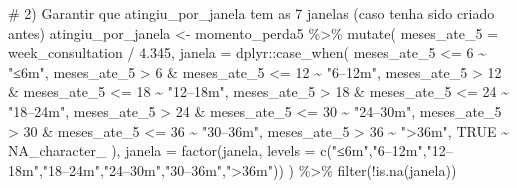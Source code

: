 \documentclass[
]{article}
\newenvironment{Shaded}{\begin{snugshade}}{\end{snugshade}}
\newcommand{\AttributeTok}[1]{\textcolor[rgb]{0.40,0.45,0.13}{#1}}
\newcommand{\CommentTok}[1]{\textcolor[rgb]{0.37,0.37,0.37}{#1}}
\newcommand{\ConstantTok}[1]{\textcolor[rgb]{0.56,0.35,0.01}{#1}}
\newcommand{\DecValTok}[1]{\textcolor[rgb]{0.68,0.00,0.00}{#1}}
\newcommand{\FloatTok}[1]{\textcolor[rgb]{0.68,0.00,0.00}{#1}}
\newcommand{\FunctionTok}[1]{\textcolor[rgb]{0.28,0.35,0.67}{#1}}
\newcommand{\NormalTok}[1]{\textcolor[rgb]{0.00,0.23,0.31}{#1}}
\newcommand{\OtherTok}[1]{\textcolor[rgb]{0.00,0.23,0.31}{#1}}
\newcommand{\SpecialCharTok}[1]{\textcolor[rgb]{0.37,0.37,0.37}{#1}}
\newcommand{\StringTok}[1]{\textcolor[rgb]{0.13,0.47,0.30}{#1}}
\begin{document}
\begin{Shaded}
\begin{Highlighting}[]
\CommentTok{\# 2) Garantir que \textasciigrave{}atingiu\_por\_janela\textasciigrave{} tem as 7 janelas (caso tenha sido criado antes)}
\NormalTok{atingiu\_por\_janela }\OtherTok{\textless{}{-}}\NormalTok{ momento\_perda5 }\SpecialCharTok{\%\textgreater{}\%}
  \FunctionTok{mutate}\NormalTok{(}
    \AttributeTok{meses\_ate\_5 =}\NormalTok{ week\_consultation }\SpecialCharTok{/} \FloatTok{4.345}\NormalTok{,}
    \AttributeTok{janela =}\NormalTok{ dplyr}\SpecialCharTok{::}\FunctionTok{case\_when}\NormalTok{(}
\NormalTok{      meses\_ate\_5 }\SpecialCharTok{\textless{}=} \DecValTok{6}                       \SpecialCharTok{\textasciitilde{}} \StringTok{"≤6m"}\NormalTok{,}
\NormalTok{      meses\_ate\_5 }\SpecialCharTok{\textgreater{}} \DecValTok{6}  \SpecialCharTok{\&}\NormalTok{ meses\_ate\_5 }\SpecialCharTok{\textless{}=} \DecValTok{12}   \SpecialCharTok{\textasciitilde{}} \StringTok{"6–12m"}\NormalTok{,}
\NormalTok{      meses\_ate\_5 }\SpecialCharTok{\textgreater{}} \DecValTok{12} \SpecialCharTok{\&}\NormalTok{ meses\_ate\_5 }\SpecialCharTok{\textless{}=} \DecValTok{18}   \SpecialCharTok{\textasciitilde{}} \StringTok{"12–18m"}\NormalTok{,}
\NormalTok{      meses\_ate\_5 }\SpecialCharTok{\textgreater{}} \DecValTok{18} \SpecialCharTok{\&}\NormalTok{ meses\_ate\_5 }\SpecialCharTok{\textless{}=} \DecValTok{24}   \SpecialCharTok{\textasciitilde{}} \StringTok{"18–24m"}\NormalTok{,}
\NormalTok{      meses\_ate\_5 }\SpecialCharTok{\textgreater{}} \DecValTok{24} \SpecialCharTok{\&}\NormalTok{ meses\_ate\_5 }\SpecialCharTok{\textless{}=} \DecValTok{30}   \SpecialCharTok{\textasciitilde{}} \StringTok{"24–30m"}\NormalTok{,}
\NormalTok{      meses\_ate\_5 }\SpecialCharTok{\textgreater{}} \DecValTok{30} \SpecialCharTok{\&}\NormalTok{ meses\_ate\_5 }\SpecialCharTok{\textless{}=} \DecValTok{36}   \SpecialCharTok{\textasciitilde{}} \StringTok{"30–36m"}\NormalTok{,}
\NormalTok{      meses\_ate\_5 }\SpecialCharTok{\textgreater{}} \DecValTok{36}                       \SpecialCharTok{\textasciitilde{}} \StringTok{"\textgreater{}36m"}\NormalTok{,}
      \ConstantTok{TRUE} \SpecialCharTok{\textasciitilde{}} \ConstantTok{NA\_character\_}
\NormalTok{    ),}
    \AttributeTok{janela =} \FunctionTok{factor}\NormalTok{(janela, }\AttributeTok{levels =} \FunctionTok{c}\NormalTok{(}\StringTok{"≤6m"}\NormalTok{,}\StringTok{"6–12m"}\NormalTok{,}\StringTok{"12–18m"}\NormalTok{,}\StringTok{"18–24m"}\NormalTok{,}\StringTok{"24–30m"}\NormalTok{,}\StringTok{"30–36m"}\NormalTok{,}\StringTok{"\textgreater{}36m"}\NormalTok{))}
\NormalTok{  ) }\SpecialCharTok{\%\textgreater{}\%}
  \FunctionTok{filter}\NormalTok{(}\SpecialCharTok{!}\FunctionTok{is.na}\NormalTok{(janela))}


\end{Highlighting}
\end{Shaded}
\end{document}
